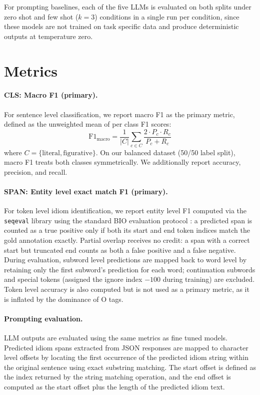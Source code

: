 \documentclass[11pt, a4paper]{report}
\begin{document}
For prompting baselines, each of the five LLMs is evaluated on both splits under zero shot and few shot ($k{=}3$) conditions in a single run per condition, since these models are not trained on task specific data and produce deterministic outputs at temperature zero.

\section{Metrics}
\label{sec:metrics}

\paragraph{CLS: Macro F1 (primary).}
For sentence level classification, we report macro F1 as the primary metric, defined as the unweighted mean of per class F1 scores:
\begin{equation}
  \text{F1}_{\text{macro}} = \frac{1}{|C|}\sum_{c \in C} \frac{2 \cdot P_c \cdot R_c}{P_c + R_c}
  \label{eq:macro_f1}
\end{equation}
where $C = \{\text{literal}, \text{figurative}\}$. On our balanced dataset (50/50 label split), macro F1 treats both classes symmetrically. We additionally report accuracy, precision, and recall.

\paragraph{SPAN: Entity level exact match F1 (primary).}
For token level idiom identification, we report entity level F1 computed via the \texttt{seqeval} library using the standard BIO evaluation protocol \citep{ramshaw1995text}: a predicted span is counted as a true positive only if both its start and end token indices match the gold annotation exactly. Partial overlap receives no credit: a span with a correct start but truncated end counts as both a false positive and a false negative. During evaluation, subword level predictions are mapped back to word level by retaining only the first subword's prediction for each word; continuation subwords and special tokens (assigned the ignore index $-100$ during training) are excluded. Token level accuracy is also computed but is not used as a primary metric, as it is inflated by the dominance of O tags.

\paragraph{Prompting evaluation.}
LLM outputs are evaluated using the same metrics as fine tuned models.
Predicted idiom spans extracted from JSON responses are mapped to
character level offsets by locating the first occurrence of the predicted
idiom string within the original sentence using exact substring matching.
The start offset is defined as the index returned by the string matching
operation, and the end offset is computed as the start offset plus the
length of the predicted idiom text.
\end{document}
